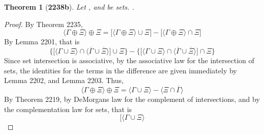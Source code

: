 \documentclass[preview]{standalone}
\newtheorem*{theorem*}{Theorem}
\begin{document}
\begin{theorem*}[\textbf{2238b}] \color{black}
    Let \bm{$\Gamma$}, and \bm{$\Xi$} be sets.
    \bm{$
    \big \langle \Gamma \oplus \Xi \big \rangle
        \oplus 
    \Xi 
        = 
    \Gamma$}.
\end{theorem*}
\begin{proof} \color{black}
    By Theorem 2235, 
    \begin{equation*}
        \Big \langle \Gamma \oplus \Xi \Big \rangle 
            \oplus 
        \Xi 
            = 
        \bigg[
            \Big \langle \Gamma \oplus \Xi \Big \rangle 
                \cup 
            \Xi
        \bigg] 
            - 
        \bigg[
            \Big \langle \Gamma \oplus \Xi \Big \rangle
                \cap 
            \Xi
        \bigg]
    \end{equation*}
    By Lemma 2201, that is
    \begin{equation*}
        \Bigg\{
            \bigg[
                \Big \langle \Gamma \cup \Xi \Big \rangle
                    \cap
                \Big \langle
                    \overline{\Gamma} 
                        \cup 
                    \overline{\Xi} 
                \Big \rangle
            \bigg]
                \cup
            \Xi
        \Bigg\}
            -
        \Bigg\{
            \bigg[
                \Big \langle \Gamma \cup \Xi \Big \rangle
                    \cap
                \Big \langle
                    \overline{\Gamma} 
                        \cup 
                    \overline{\Xi} 
                \Big \rangle
            \bigg]
                \cap
            \Xi
        \Bigg\}
    \end{equation*}
    Since set intersection is associative, 
    by the associative law for the intersection of sets, 
    the identities for the terms in the difference are given immediately
    by Lemma 2202, and Lemma 2203. Thus, 
    \begin{equation*}
        \Big \langle \Gamma \oplus \Xi \Big \rangle 
            \oplus 
        \Xi
            =
        \Big \langle \Gamma \cup \Xi \Big \rangle
            -
        \Big \langle 
            \Xi
                \cap 
            \overline{\Gamma} 
        \Big \rangle
    \end{equation*}
    By Theorem 2219, 
    by DeMorgans law for the complement of intersections, 
    and by the complementation law for sets, 
    that is
    \begin{equation*}
        \bigg[
            \Big \langle \Gamma \cup \Xi \Big \rangle

\end{equation*}
\end{proof}
\end{document}
